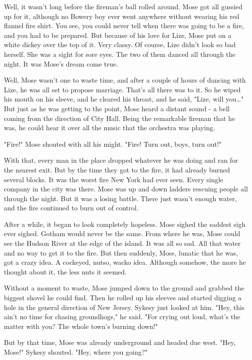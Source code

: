 Well, it wasn't long before the fireman's ball rolled around. Mose got all gussied up for it, although no Bowery boy ever went anywhere without wearing his red flannel fire shirt. You see, you could never tell when there was going to be a fire, and you had to be prepared. But because of his love for Lize, Mose put on a white dickey over the top of it. Very classy. Of course, Lize didn't look so bad herself. She was a sight for sore eyes. The two of them danced all through the night. It was Mose's dream come true.

Well, Mose wasn't one to waste time, and after a couple of hours of dancing with Lize, he was all set to propose marriage. That's all there was to it. So he wiped his mouth on his sleeve, and he cleared his throat, and he said, "Lize, will you\dots" But just as he was getting to the point, Mose heard a distant sound - a bell coming from the direction of City Hall. Being the remarkable fireman that he was, he could hear it over all the music that the orchestra was playing.

"Fire!" Mose shouted with all his might. "Fire! Turn out, boys, turn out!"

With that, every man in the place dropped whatever he was doing and ran for the nearest exit. But by the time they got to the fire, it had already burned several blocks. It was the worst fire New York had ever seen. Every single company in the city was there. Mose was up and down ladders rescuing people all through the night. But it was a losing battle. There just wasn't enough water, and the fire continued to burn out of control.

After a while, it began to look completely hopeless. Mose sighed the saddest sigh ever sighed. Gotham would never be the same. From where he was, Mose could see the Hudson River at the edge of the island. It was all so sad. All that water and no way to get it to the fire. But then suddenly, Mose, lunatic that he was, got a crazy idea. A cockeyed, nutso, wacko idea. Although somehow, the more he thought about it, the less nuts it seemed.

Without a moment to waste, Mose jumped down to the ground and grabbed the biggest shovel he could find. Then he rolled up his sleeves and started digging a hole in the general direction of New Jersey. Sykesy just looked at him. "Hey, this ain't no time for chasing groundhogs," he said. "For crying out loud, what's the matter with you? The whole town's burning down!"

But by that time, Mose was already underground and headed due west. "Hey, Mose!" Sykesy shouted. "Hey, where you going?"

